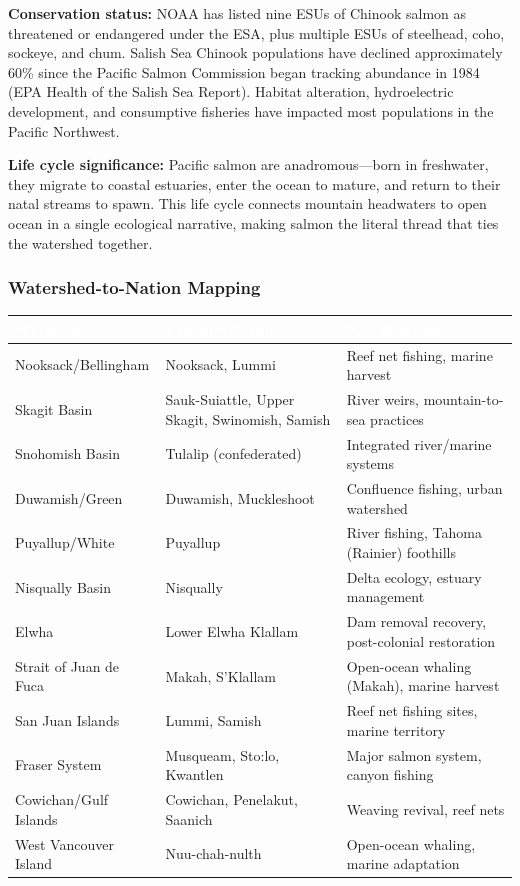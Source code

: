 \documentclass[11pt,letterpaper]{article}
\newcommand{\tableheader}[1]{\textbf{\sffamily\textcolor{white}{#1}}}
\begin{document}
\textbf{Conservation status:} NOAA has listed nine ESUs of Chinook salmon as threatened or endangered under the ESA, plus multiple ESUs of steelhead, coho, sockeye, and chum. Salish Sea Chinook populations have declined approximately 60\% since the Pacific Salmon Commission began tracking abundance in 1984 (EPA Health of the Salish Sea Report). Habitat alteration, hydroelectric development, and consumptive fisheries have impacted most populations in the Pacific Northwest.

\textbf{Life cycle significance:} Pacific salmon are anadromous---born in freshwater, they migrate to coastal estuaries, enter the ocean to mature, and return to their natal streams to spawn. This life cycle connects mountain headwaters to open ocean in a single ecological narrative, making salmon the literal thread that ties the watershed together.

\subsubsection{Watershed-to-Nation Mapping}

\begin{center}
\begin{tabularx}{\textwidth}{L{3cm}L{3.5cm}X}
\toprule
{}
\tableheader{Watershed} & \tableheader{Primary Nations} & \tableheader{Key Practices} \\
\midrule
Nooksack/Bellingham & Nooksack, Lummi & Reef net fishing, marine harvest \\
Skagit Basin & Sauk-Suiattle, Upper Skagit, Swinomish, Samish & River weirs, mountain-to-sea practices \\
Snohomish Basin & Tulalip (confederated) & Integrated river/marine systems \\
Duwamish/Green & Duwamish, Muckleshoot & Confluence fishing, urban watershed \\
Puyallup/White & Puyallup & River fishing, Tahoma (Rainier) foothills \\
Nisqually Basin & Nisqually & Delta ecology, estuary management \\
Elwha & Lower Elwha Klallam & Dam removal recovery, post-colonial restoration \\
Strait of Juan de Fuca & Makah, S'Klallam & Open-ocean whaling (Makah), marine harvest \\
San Juan Islands & Lummi, Samish & Reef net fishing sites, marine territory \\
Fraser System & Musqueam, Sto:lo, Kwantlen & Major salmon system, canyon fishing \\
Cowichan/Gulf Islands & Cowichan, Penelakut, Saanich & Weaving revival, reef nets \\
West Vancouver Island & Nuu-chah-nulth & Open-ocean whaling, marine adaptation \\
\bottomrule
\end{tabularx}
\end{center}
\end{document}

